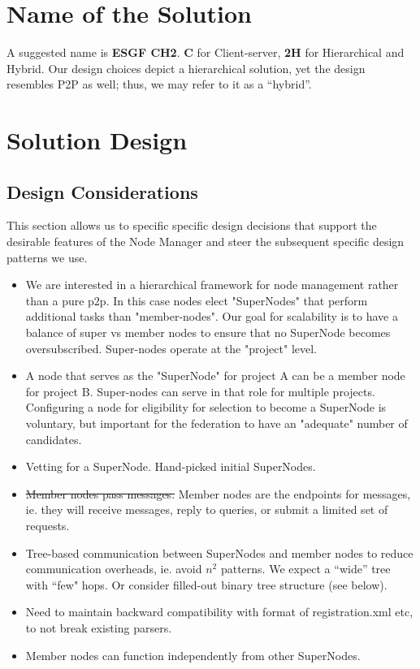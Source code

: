\documentclass[oneside,12pt]{memoir}
\begin{document}
\chapter{Name of the Solution}

A suggested name is \textbf{ESGF CH2}.  \textbf{C} for Client-server, \textbf{2H} for Hierarchical and Hybrid.  Our design choices depict a hierarchical solution, yet the design resembles P2P as well; thus, we may refer to it as a ``hybrid''.


\chapter{Solution Design}

\section{Design Considerations}
This section allows us to specific specific design decisions that support the desirable features of the Node Manager and steer the subsequent specific design patterns we use.

\begin{itemize}
\item 


We are interested in a hierarchical framework for node management rather than a pure p2p.  In this case nodes elect "SuperNodes" that perform additional tasks than "member-nodes".  Our goal for scalability is to have a balance of super vs member nodes to ensure that no SuperNode becomes oversubscribed.  Super-nodes operate at the "project" level.   
\item
A node that serves as the "SuperNode" for project A can be a member node for project B.  Super-nodes can serve in that role for multiple projects.    Configuring a node for eligibility for selection to become a SuperNode is voluntary, but important for the federation to have an "adequate" number of candidates.
\item
Vetting for a SuperNode. Hand-picked initial SuperNodes.  
\item
\sout{Member nodes pass messages. }  Member nodes are the endpoints for messages, ie. they will receive messages, reply to queries, or submit a limited set of requests.  

\item
Tree-based communication between SuperNodes and member nodes to reduce communication overheads, ie. avoid $n^2$ patterns.  We expect a ``wide'' tree with ``few" hops. Or consider filled-out binary tree structure (see below). 
\item 
Need to maintain backward compatibility with format of registration.xml etc, to not break existing parsers. 
\item
Member nodes can function independently from other SuperNodes. 
\end{itemize}
\end{document}
